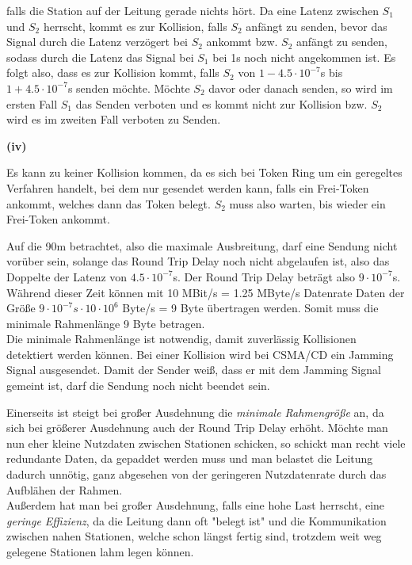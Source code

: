 \documentclass{../exercisesheet}
\begin{document}
\begin{exercise}{6}
\begin{subexercise}
\begin{adjustwidth}{2em}{0em}
	falls die Station auf der Leitung gerade nichts hört. Da eine Latenz zwischen $S_1$ und $S_2$ herrscht, kommt es zur Kollision, falls $S_2$ anfängt zu senden, bevor
	das Signal durch die Latenz verzögert bei $S_2$ ankommt bzw. $S_2$ anfängt zu senden, sodass durch die Latenz das Signal bei $S_1$ bei 1s noch nicht angekommen ist.
	Es folgt also, dass es zur Kollision kommt, falls $S_2$ von $1-4.5\cdot 10^{-7}$s bis $1+4.5\cdot 10^{-7}$s senden möchte. Möchte $S_2$ davor oder danach senden, so
	wird im ersten Fall $S_1$ das Senden verboten und es kommt nicht zur Kollision bzw. $S_2$ wird es im zweiten Fall verboten zu Senden.\\
\end{adjustwidth}
\textbf{(iv)}
\begin{adjustwidth}{2em}{0em}\vspace{-\baselineskip}
	Es kann zu keiner Kollision kommen, da es sich bei Token Ring um ein geregeltes Verfahren handelt, bei dem nur gesendet werden kann, falls ein Frei-Token ankommt, 
	welches dann das Token belegt. $S_2$ muss also warten, bis wieder ein Frei-Token ankommt.
\end{adjustwidth}
\end{subexercise}
\begin{subexercise}
	Auf die 90m betrachtet, also die maximale Ausbreitung, darf eine Sendung nicht vorüber sein, solange das Round Trip Delay noch nicht abgelaufen ist, also das Doppelte
	der Latenz von $4.5\cdot 10^{-7}$s. Der Round Trip Delay beträgt also $9\cdot 10^{-7}$s. Während dieser Zeit können mit 10 MBit/s = 1.25 MByte/s Datenrate Daten der
	Größe $9\cdot 10^{-7}s \cdot 10 \cdot 10^6$ Byte/s = 9 Byte übertragen werden. Somit muss die minimale Rahmenlänge 9 Byte betragen.\\
	Die minimale Rahmenlänge ist notwendig, damit zuverlässig Kollisionen detektiert werden können. Bei einer Kollision wird bei CSMA/CD ein Jamming Signal ausgesendet. Damit
	der Sender weiß, dass er mit dem Jamming Signal gemeint ist, darf die Sendung noch nicht beendet sein.
\end{subexercise}
\begin{subexercise}
	Einerseits ist steigt bei großer Ausdehnung die \textit{minimale Rahmengröße} an, da sich bei größerer Ausdehnung auch der Round Trip Delay erhöht. Möchte man nun
	eher kleine Nutzdaten zwischen Stationen schicken, so schickt man recht viele redundante Daten, da gepaddet werden muss und man belastet die Leitung dadurch unnötig, ganz
	abgesehen von der geringeren Nutzdatenrate durch das Aufblähen der Rahmen.\\
	Außerdem hat man bei großer Ausdehnung, falls eine hohe Last herrscht, eine \textit{geringe Effizienz}, da die Leitung dann oft "belegt ist" und die Kommunikation zwischen
	nahen Stationen, welche schon längst fertig sind, trotzdem weit weg gelegene Stationen lahm legen können.
	
\end{subexercise}
\end{exercise}
\end{document}
